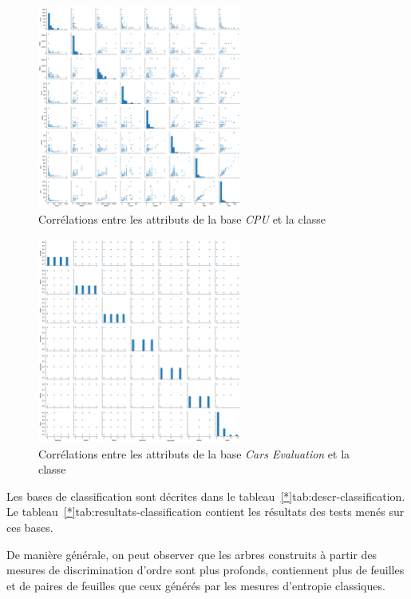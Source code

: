 \documentclass[a4paper]{article}
\newcommand{\tabref}[1]{tableau~\ref{#1}}
\begin{document}
\begin{figure}[H]
	\center 
	\includegraphics[width=0.6\textwidth]{images/cpu.png}
    \caption{Corrélations entre les attributs de la base \emph{CPU}
    et la classe}
    \label{img:cpu}
\end{figure}

\begin{figure}[H]
	\center 
	\includegraphics[width=0.6\textwidth]{images/cars.png}
    \caption{Corrélations entre les attributs de la base \emph{Cars Evaluation}
    et la classe}
    \label{img:cars}
\end{figure}

Les bases de classification sont décrites dans le
\tabref*{tab:descr-classification}. Le \tabref*{tab:resultats-classification}
contient les résultats des tests menés sur ces bases.

De manière générale, on peut observer que les arbres construits à partir des
mesures de discrimination d'ordre sont plus profonds, contiennent plus de
feuilles et de paires de feuilles que ceux générés par les mesures d'entropie
classiques. 
\end{document}
